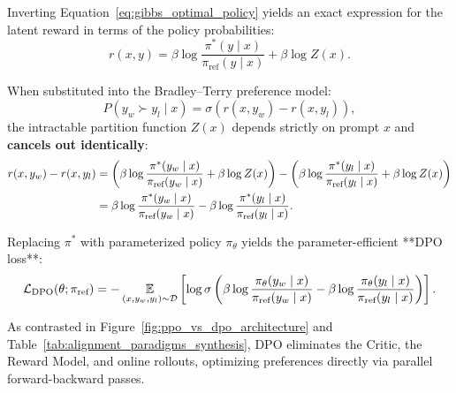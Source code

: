 \documentclass[../../../main.tex]{subfiles}
\begin{document}
Inverting Equation~\eqref{eq:gibbs_optimal_policy} yields an exact expression for the latent reward in terms of the policy probabilities:
\begin{equation}
\label{eq:inverted_reward_dpo}
r(x, y) = \beta \log \frac{\pi^*(y \mid x)}{\pi_{\text{ref}}(y \mid x)} + \beta \log Z(x).
\end{equation}

When substituted into the Bradley--Terry preference model:
\begin{equation}
P(y_w \succ y_l \mid x) = \sigma\left(r(x, y_w) - r(x, y_l)\right),
\end{equation}
the intractable partition function $Z(x)$ depends strictly on prompt $x$ and \textbf{cancels out identically}:
\begin{align}
r(x, y_w) - r(x, y_l) &= \left( \beta \log \frac{\pi^*(y_w \mid x)}{\pi_{\text{ref}}(y_w \mid x)} + \beta \log Z(x) \right) - \left( \beta \log \frac{\pi^*(y_l \mid x)}{\pi_{\text{ref}}(y_l \mid x)} + \beta \log Z(x) \right) \notag \\
&= \beta \log \frac{\pi^*(y_w \mid x)}{\pi_{\text{ref}}(y_w \mid x)} - \beta \log \frac{\pi^*(y_l \mid x)}{\pi_{\text{ref}}(y_l \mid x)}.
\end{align}

Replacing $\pi^*$ with parameterized policy $\pi_\theta$ yields the parameter-efficient **DPO loss**:
\begin{equation}
\label{eq:dpo_closed_loss}
\mathcal{L}_{\text{DPO}}(\theta; \pi_{\text{ref}}) = -\operatorname*{\mathbb{E}}_{(x, y_w, y_l) \sim \mathcal{D}} \left[ \log \sigma\left( \beta \log \frac{\pi_\theta(y_w \mid x)}{\pi_{\text{ref}}(y_w \mid x)} - \beta \log \frac{\pi_\theta(y_l \mid x)}{\pi_{\text{ref}}(y_l \mid x)} \right) \right].
\end{equation}

As contrasted in Figure~\ref{fig:ppo_vs_dpo_architecture} and Table~\ref{tab:alignment_paradigms_synthesis}, DPO eliminates the Critic, the Reward Model, and online rollouts, optimizing preferences directly via parallel forward-backward passes.
\end{document}
